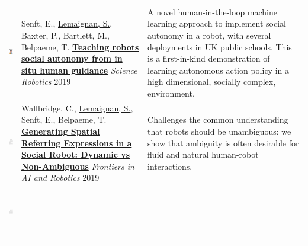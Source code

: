 \documentclass[11pt,a4paper]{report}
\begin{document}
\hspace*{-0.5cm}\begin{tabular}{p{1.7cm}p{7cm}p{8cm}}

    \vspace{-0.2cm}\includegraphics[height=2.2cm]{thumbs/2019-science.png} & Senft, E.,
    \underline{Lemaignan, S.}, Baxter, P., Bartlett, M., Belpaeme, T.
    \newline\href{https://doi.org/10.1126/scirobotics.aat1186}{\textbf{Teaching robots
    social autonomy from in situ human guidance}}
    \newline \textit{Science Robotics} 2019
    & \small A novel human-in-the-loop machine learning approach
    to implement social autonomy in a robot, with several deployments in UK
    public schools. This is a first-in-kind demonstration of learning autonomous
    action policy in a high dimensional, socially complex,
    environment.\textbf{} \\


    \vspace{-.20cm}\includegraphics[height=2.2cm]{thumbs/2019-frontiers-chris.jpg} &

    Wallbridge, C., \underline{Lemaignan, S.}, Senft, E., Belpaeme, T.  
    \newline\href{https://doi.org/10.3389/frobt.2019.00067}{\textbf{Generating
    Spatial Referring Expressions in a Social Robot: Dynamic vs Non-Ambiguous}}
    \newline \textit{Frontiers in AI and Robotics} 2019
    & \small Challenges the common understanding that robots should be
    unambiguous: we show that ambiguity is often desirable for fluid and natural
    human-robot interactions.\textbf{}  \\

    \vspace{-.20cm}\includegraphics[height=2.2cm]{thumbs/2019-frontiers-maddy.jpg} &


\end{tabular}
\end{document}
